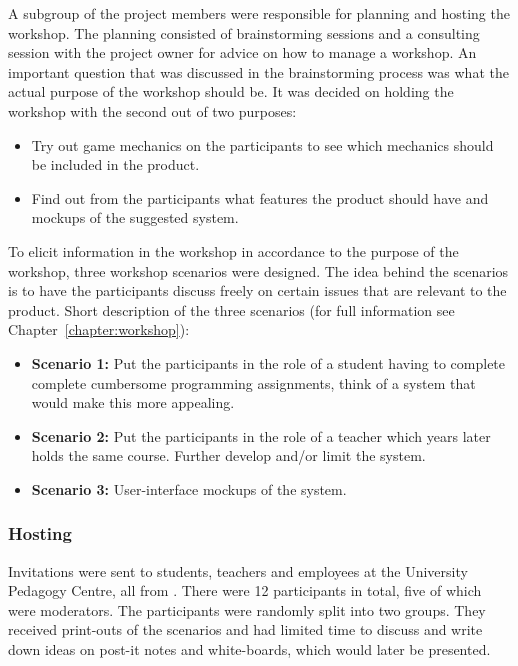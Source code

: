 A subgroup of the project members were responsible for planning and hosting the workshop. The planning consisted of brainstorming sessions and a consulting session with the project owner for advice on how to manage a workshop. An important question that was discussed in the brainstorming process was what the actual purpose of the workshop should be. It was decided on holding the workshop with the second out of two purposes:
\begin{itemize}  
    \item Try out game mechanics on the participants to see which mechanics should be included in the product.
    \item Find out from the participants what features the product should have and mockups of the suggested system. 
\end{itemize}

To elicit information in the workshop in accordance to the purpose of the workshop, three workshop scenarios were designed. The idea behind the scenarios is to have the participants discuss freely on certain issues that are relevant to the product. Short description of the three scenarios (for full information see Chapter~\ref{chapter:workshop}):
\begin{itemize}  
    \item \textbf{Scenario 1:} Put the participants in the role of a student having to complete complete cumbersome programming assignments, think of a system that would make this more appealing.
    \item \textbf{Scenario 2:} Put the participants in the role of a teacher which years later holds the same course. Further develop and/or limit the system.
    \item \textbf{Scenario 3:} User-interface mockups of the system.
\end{itemize}
    
\subsubsection{Hosting}
Invitations were sent to students, teachers and employees at the University Pedagogy Centre, all from \LTU{}. There were 12 participants in total, five of which were moderators. The participants were randomly split into two groups. They received print-outs of the scenarios and had limited time to discuss and write down ideas on post-it notes and white-boards, which would later be presented.

